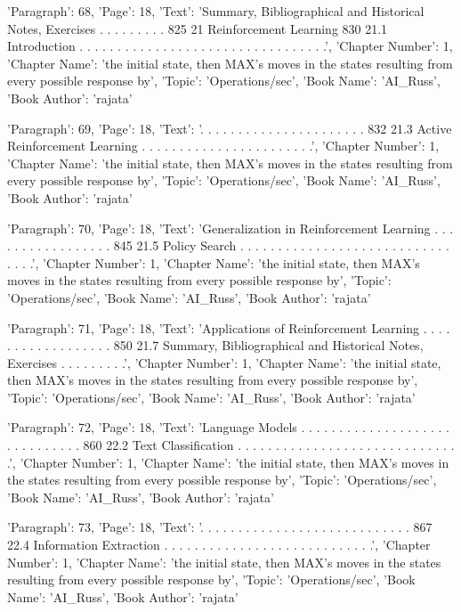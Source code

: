 {'Paragraph': 68, 'Page': 18, 'Text': 'Summary, Bibliographical and Historical Notes, Exercises . . . . . . . . . 825 21 Reinforcement Learning 830 21.1 Introduction . . . . . . . . . . . . . . . . . . . . . . . . . . . . . . . . .', 'Chapter Number': 1, 'Chapter Name': 'the initial state, then MAX’s moves in the states resulting from every possible response by', 'Topic': 'Operations/sec', 'Book Name': 'AI_Russ', 'Book Author': 'rajata'}

{'Paragraph': 69, 'Page': 18, 'Text': '. . . . . . . . . . . . . . . . . . . . . . 832 21.3 Active Reinforcement Learning . . . . . . . . . . . . . . . . . . . . . . .', 'Chapter Number': 1, 'Chapter Name': 'the initial state, then MAX’s moves in the states resulting from every possible response by', 'Topic': 'Operations/sec', 'Book Name': 'AI_Russ', 'Book Author': 'rajata'}

{'Paragraph': 70, 'Page': 18, 'Text': 'Generalization in Reinforcement Learning . . . . . . . . . . . . . . . . . 845 21.5 Policy Search . . . . . . . . . . . . . . . . . . . . . . . . . . . . . . . .', 'Chapter Number': 1, 'Chapter Name': 'the initial state, then MAX’s moves in the states resulting from every possible response by', 'Topic': 'Operations/sec', 'Book Name': 'AI_Russ', 'Book Author': 'rajata'}

{'Paragraph': 71, 'Page': 18, 'Text': 'Applications of Reinforcement Learning . . . . . . . . . . . . . . . . . . 850 21.7 Summary, Bibliographical and Historical Notes, Exercises . . . . . . . . .', 'Chapter Number': 1, 'Chapter Name': 'the initial state, then MAX’s moves in the states resulting from every possible response by', 'Topic': 'Operations/sec', 'Book Name': 'AI_Russ', 'Book Author': 'rajata'}

{'Paragraph': 72, 'Page': 18, 'Text': 'Language Models . . . . . . . . . . . . . . . . . . . . . . . . . . . . . . 860 22.2 Text Classiﬁcation . . . . . . . . . . . . . . . . . . . . . . . . . . . . . .', 'Chapter Number': 1, 'Chapter Name': 'the initial state, then MAX’s moves in the states resulting from every possible response by', 'Topic': 'Operations/sec', 'Book Name': 'AI_Russ', 'Book Author': 'rajata'}

{'Paragraph': 73, 'Page': 18, 'Text': '. . . . . . . . . . . . . . . . . . . . . . . . . . . . 867 22.4 Information Extraction . . . . . . . . . . . . . . . . . . . . . . . . . . . .', 'Chapter Number': 1, 'Chapter Name': 'the initial state, then MAX’s moves in the states resulting from every possible response by', 'Topic': 'Operations/sec', 'Book Name': 'AI_Russ', 'Book Author': 'rajata'}

